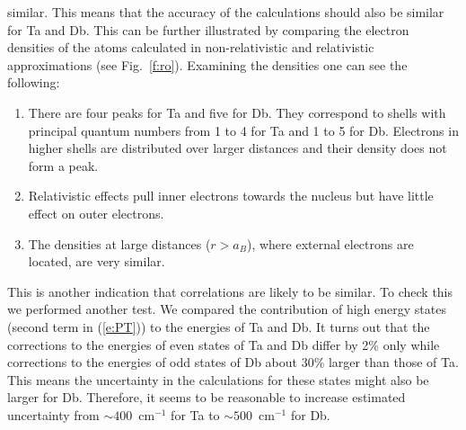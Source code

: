 \documentclass[10pt,a4paper, twoside, openright]{report}
\begin{document}
similar. This means that the accuracy of the calculations should also be similar for Ta and Db.
This can be further illustrated by comparing the electron densities of the atoms calculated in non-relativistic and relativistic
approximations (see Fig.~\ref{f:ro}). Examining the densities one can see the following:
\begin{enumerate}
\item There are four peaks for Ta and five for Db. They correspond to shells with principal quantum numbers from 1 to 4 for
Ta and 1 to 5 for Db. Electrons in higher shells are distributed over larger distances and their density does not form a peak.
\item   Relativistic effects pull inner electrons towards the nucleus but have little effect on outer electrons.
\item The densities at large distances ($r>a_B$), where external electrons are located, are very similar.
\end{enumerate}
This is another indication that correlations are likely to be similar.  To check this we performed another test. We
compared the contribution of high energy states (second term in (\ref{e:PT})) to the energies of Ta and Db.
It turns out that the corrections to the energies of even states of Ta and Db differ by 2\% only while corrections to 
the energies of odd states of Db about 30\% larger than those of Ta. This means the uncertainty in the calculations for these
states might also be larger for Db. Therefore, it seems to be reasonable to increase estimated uncertainty from 
$ \sim 400$~cm$^{-1}$ for Ta to $ \sim 500$~cm$^{-1}$ for Db.
\end{document}
